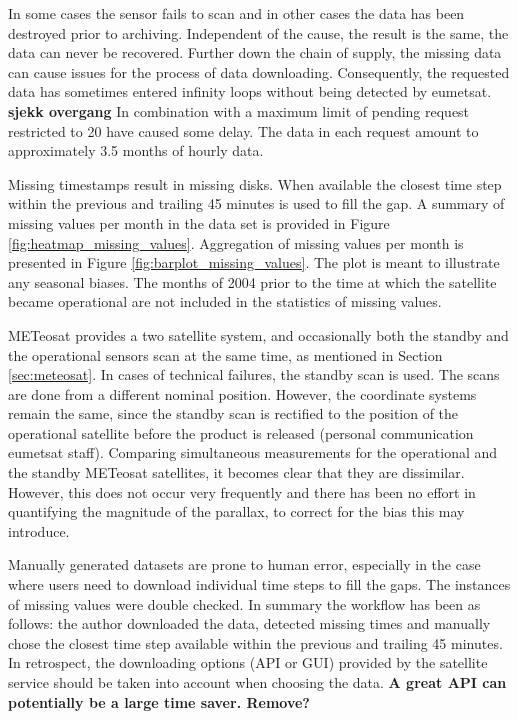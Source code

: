 In some cases the sensor fails to scan and in other cases the data has been destroyed prior to archiving. Independent of the cause, the result is the same, the data can never be recovered. Further down the chain of supply, the missing data can cause issues for the process of data downloading. Consequently, the requested data has sometimes entered infinity loops without being detected by \acrshort{eumetsat}. \textbf{sjekk overgang} In combination with 
a maximum limit of pending request restricted to 20 have caused some delay. The data in each request amount to approximately 3.5 months of hourly data. 

Missing timestamps result in missing disks. When available the closest time step within the previous and trailing 45 minutes is used to fill the gap. A summary of missing values per month in the data set is provided in Figure \ref{fig:heatmap_missing_values}. Aggregation of missing values per month is presented in Figure \ref{fig:barplot_missing_values}. The plot is meant to illustrate any seasonal biases. The months of 2004 prior to the time at which the satellite became operational are not included in the statistics of missing values.

METeosat provides a two satellite system, and occasionally both the standby and the operational sensors scan at the same time, as mentioned in Section \ref{sec:meteosat}.
In cases of technical failures, the standby scan is used. The scans are done from a different nominal position. However, the coordinate systems remain the same, since the standby scan is rectified to the position of the operational satellite before the product is released (personal communication \acrshort{eumetsat} staff). Comparing simultaneous measurements for the operational and the standby METeosat satellites, it becomes clear that they are dissimilar. However, this does not occur very frequently and there has been no effort in quantifying the magnitude of the parallax, to correct for the bias this may introduce.

Manually generated datasets are prone to human error, especially in the case where users need to download individual time steps to fill the gaps. The instances of missing values were double checked. In summary the workflow has been as follows: the author downloaded the data, detected missing times and manually chose the closest time step available within the previous and trailing 45 minutes. In retrospect, the downloading options (API or GUI) provided by the satellite service should be taken into account when choosing the data. \textbf{A great API can potentially be a large time saver. Remove?}

